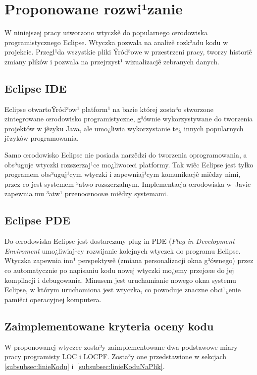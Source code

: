 \section{Proponowane rozwi¹zanie}
\label{sec:czwarta}

W niniejszej pracy utworzono wtyczkê do popularnego œrodowiska programistycznego Eclipse. Wtyczka pozwala 
na analizê rozk³adu kodu w projekcie. Przegl¹da wszystkie pliki Ÿród³owe w przestrzeni pracy, tworzy
historiê zmiany plików i pozwala na przejrzyst¹ wizualizacjê zebranych danych.

	\subsection{Eclipse IDE}
	
	Eclipse \cite{website:eclipse} otwartoŸród³ow¹ platform¹ na bazie której zosta³o stworzone 
	zintegrowane œrodowisko programistyczne, g³ównie wykorzystywane do tworzenia projektów w jêzyku Java,
	ale umo¿liwia wykorzystanie te¿ innych popularnych jêzyków programowania. 
	
	Samo œrodowisko Eclipse nie posiada narzêdzi do tworzenia oprogramowania, a obs³uguje wtyczki
	rozszerzaj¹ce mo¿liwoœci platformy. Tak wiêc Eclipse jest tylko programem obs³uguj¹cym wtyczki
	i zapewniaj¹cym komunikacjê miêdzy nimi, przez co jest systemem ³atwo rozszerzalnym. Implementacja 
	œrodowiska w~Javie zapewnia mu ³atw¹ przenoœnoœæ miêdzy systemami.
	
	\subsection{Eclipse PDE}
	
	Do œrodowiska Eclipse jest dostarczany plug-in PDE (\textit{Plug-in Development Enviroment}
	umo¿liwiaj¹cy rozwijanie kolejnych wtyczek do programu Eclipse. Wtyczka zapewnia inn¹ perspektywê
	(zmiana personalizacji okna g³ównego) przez co automatycznie po napisaniu kodu nowej wtyczki mo¿emy
	przejœæ do jej kompilacji i debugowania. Minusem jest uruchamianie nowego okna systemu Eclipse, w 
	którym uruchomiona jest wtyczka, co powoduje znaczne obci¹¿enie pamiêci operacyjnej komputera.
	
	\subsection{Zaimplementowane kryteria oceny kodu}
	
	W proponowanej wtyczce zosta³y zaimplementowane dwa podstawowe miary pracy programisty LOC i LOCPF.
	Zosta³y one przedstawione w sekcjach \ref{subsubsec:linieKodu} i~\ref{subsubsec:linieKoduNaPlik}.
	
